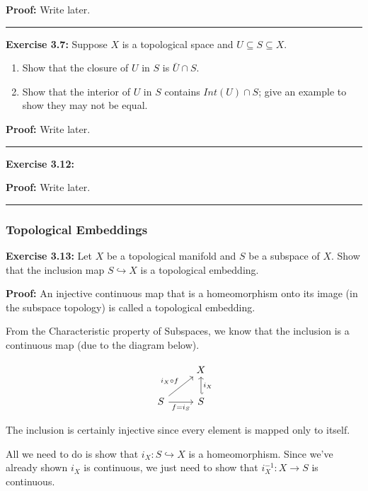 \documentclass{article}
\begin{document}
\vskip 0.5cm

\textbf{Proof:} Write later.

\vskip 0.5cm
\hrule
\vskip 0.5cm


\textbf{Exercise 3.7:} Suppose $X$ is a topological space and $U 
\subseteq S \subseteq X$.

\begin{enumerate}
  \item Show that the closure of $U$ in $S$ is $\bar{U} \cap S$.
  \item Show that the interior of $U$ in $S$ contains $Int(U) \cap S$; give an example to show they may not be equal.
\end{enumerate}

\vskip 0.5cm

\textbf{Proof:} Write later.

\vskip 0.5cm
\hrule
\vskip 0.5cm

\textbf{Exercise 3.12:} 

\vskip 0.5cm

\textbf{Proof:} Write later.

\vskip 0.5cm
\hrule
\vskip 0.5cm

\subsubsection{Topological Embeddings}

\textbf{Exercise 3.13:} Let $X$ be a topological manifold and $S$ be a subspace of $X$. Show that the inclusion map $S \hookrightarrow X$ is a topological embedding. 

\vskip 0.5cm

\textbf{Proof:} An injective continuous map that is a homeomorphism onto its image (in the subspace topology) is called a topological embedding.

\vskip 0.5cm

From the Characteristic property of Subspaces, we know that the inclusion is a continuous map (due to the diagram below). 

\[\begin{tikzcd}
	& X \\
	S & S
	\arrow["{f = i_S}"', from=2-1, to=2-2]
	\arrow["{i_X \circ f}", from=2-1, to=1-2]
	\arrow["{i_X}"', hook', from=2-2, to=1-2]
\end{tikzcd}\]

The inclusion is certainly injective since every element is mapped only to itself.

\vskip 0.5cm
All we need to do is show that $i_X : S \hookrightarrow X$ is a homeomorphism. Since we've already shown $i_X$ is continuous, we just need to show that $i_X^{-1} : X \rightarrow S$ is continuous.
\end{document}
